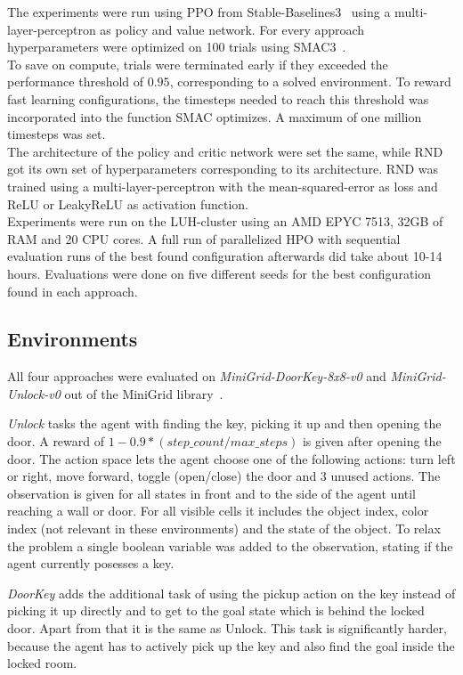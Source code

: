 \documentclass{article}
\begin{document}
The experiments were run using PPO from Stable-Baselines3~\citep{sb3} using a multi-layer-perceptron as policy and value network. For every approach hyperparameters were optimized on 100 trials using SMAC3~\citep{smac}. \\
To save on compute, trials were terminated early if they exceeded the performance threshold of $0.95$, corresponding to a solved environment. To reward fast learning configurations, the timesteps needed to reach this threshold was incorporated into the function SMAC optimizes. A maximum of one million timesteps was set. \\
The architecture of the policy and critic network were set the same, while RND got its own set of hyperparameters corresponding to its architecture. RND was trained using a multi-layer-perceptron with the mean-squared-error as loss and ReLU or LeakyReLU as activation function. \\
Experiments were run on the LUH-cluster using an AMD EPYC 7513, 32GB of RAM and 20 CPU cores. A full run of parallelized HPO with sequential evaluation runs of the best found configuration afterwards did take about 10-14 hours. Evaluations were done on five different seeds for the best configuration found in each approach.

\subsection{Environments}
\label{sec:environments}

All four approaches were evaluated on \textit{MiniGrid-DoorKey-8x8-v0} and \textit{MiniGrid-Unlock-v0} out of the MiniGrid library~\citep{minigrid}.

\textit{Unlock} tasks the agent with finding the key, picking it up and then opening the door. A reward of $1 - 0.9 * (step\_count / max\_steps)$ is given after opening the door. The action space lets the agent choose one of the following actions: turn left or right, move forward, toggle (open/close) the door and 3 unused actions. The observation is given for all states in front and to the side of the agent until reaching a wall or door. For all visible cells it includes the object index, color index (not relevant in these environments) and the state of the object. To relax the problem a single boolean variable was added to the observation, stating if the agent currently posesses a key.

\textit{DoorKey} adds the additional task of using the pickup action on the key instead of picking it up directly and to get to the goal state which is behind the locked door. Apart from that it is the same as Unlock. This task is significantly harder, because the agent has to actively pick up the key and also find the goal inside the locked room.
\end{document}
